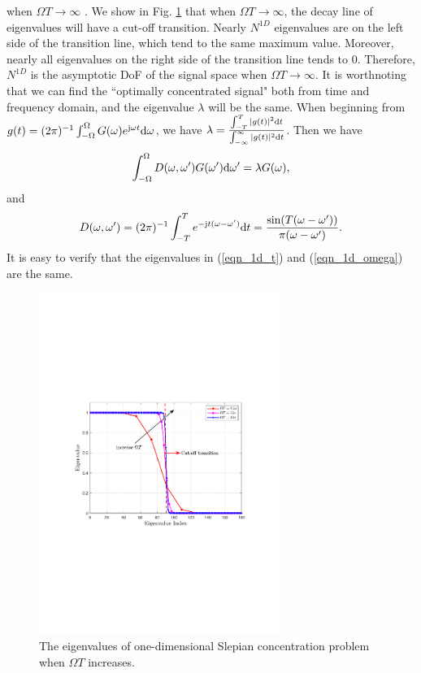\documentclass[12pt,draftclsnofoot,journal,onecolumn]{IEEEtran}
\begin{document}
	when $\Omega T \rightarrow \infty$ \cite{slepian1961prolate}. We show in Fig. \ref{1d_omegaT} that when $\Omega T \rightarrow \infty$, the decay line of eigenvalues will have a cut-off transition. Nearly $N^{1D}$ eigenvalues are on the left side of the transition line, which tend to the same maximum value. Moreover, nearly all eigenvalues on the right side of the transition line tends to 0. Therefore, $N^{1D}$ is the asymptotic DoF of the signal space when $\Omega T \rightarrow \infty$. {\color{red}It is worthnoting that we can find the ``optimally concentrated signal" both from time and frequency domain, and the eigenvalue $\lambda$ will be the same. When beginning from $g(t) = (2\pi)^{-1}\int_{-\Omega}^{\Omega}G(\omega)e^{{\rm j}\omega t} {\rm d}\omega$, we have $\lambda = \frac{\int_{-T}^{T}|g(t)|^2{\rm d}t}{\int_{-\infty}^{\infty}|g(t)|^2{\rm d}t}$. Then we have 
	\begin{equation}
	\begin{aligned}
		\int_{-\Omega}^{\Omega}D(\omega,\omega')G(\omega'){\rm d}\omega' = \lambda G(\omega),
	\end{aligned}
	\label{eqn_1d_omega}
	\end{equation}
	and
	\begin{equation}
		\begin{aligned}
			D(\omega,\omega') = (2\pi)^{-1}\int_{-T}^T e^{-{\rm j}t(\omega-\omega')}{\rm d}t = \frac{\sin(T(\omega-\omega'))}{\pi(\omega-\omega')}.
		\end{aligned}
	\end{equation}
	It is easy to verify that the eigenvalues in (\ref{eqn_1d_t}) and (\ref{eqn_1d_omega}) are the same.
	}
	
	\begin{figure}
		\centering 
		\includegraphics[width=0.7\textwidth]{figs/save_1d_different_omegaT.pdf} 
		\caption{The eigenvalues of one-dimensional Slepian concentration problem when $\Omega T$ increases.} 
		\label{1d_omegaT}
	\end{figure}
	
\end{document}
